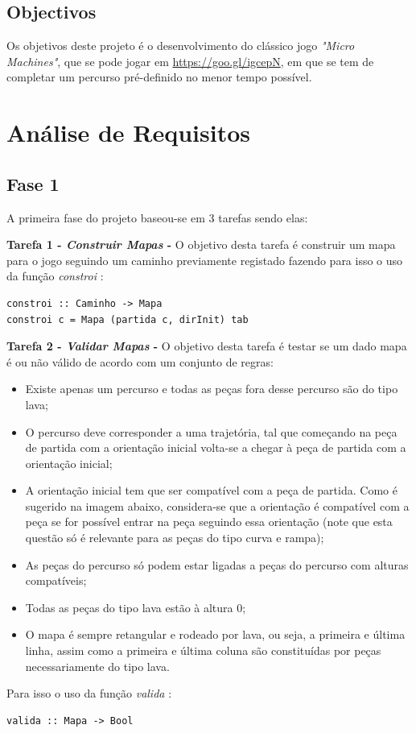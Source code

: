 \documentclass[a4paper]{report} %
\begin{document}
  \section{Objectivos}
Os objetivos deste projeto é o desenvolvimento do clássico jogo 
\emph{"Micro Machines"}, que se pode jogar em \url{https://goo.gl/igcepN}, em que se tem de completar um percurso pré-definido no menor tempo possível.





\chapter{Análise de Requisitos}

\section{Fase 1}
\label{sec:analisefase1}

A primeira fase do projeto baseou-se em 3 tarefas sendo elas:

\textbf{ Tarefa 1 - \emph{Construir Mapas} -} O objetivo desta tarefa é construir um mapa para o jogo seguindo um caminho previamente registado fazendo para isso o uso da função \emph{constroi} : 
\begin{verbatim}
constroi :: Caminho -> Mapa
constroi c = Mapa (partida c, dirInit) tab
\end{verbatim}




\textbf{ Tarefa 2 - \emph{Validar Mapas} -} O objetivo desta tarefa é testar se um dado mapa é ou não válido de acordo com um conjunto
de regras:
\begin{itemize}
\item Existe apenas um percurso e todas as peças fora desse percurso são do tipo lava;
\item O percurso deve corresponder a uma trajetória, tal que começando na peça de partida
com a orientação inicial volta-se a chegar à peça de partida com a orientação inicial;
\item A orientação inicial tem que ser compatível com a peça de partida. Como é sugerido na
imagem abaixo, considera-se que a orientação é compatível com a peça se for possível
entrar na peça seguindo essa orientação (note que esta questão só é relevante para as
peças do tipo curva e rampa);
\item As peças do percurso só podem estar ligadas a peças do percurso com alturas
compatíveis;
\item Todas as peças do tipo lava estão à altura 0;
\item O mapa é sempre retangular e rodeado por lava, ou seja, a primeira e última linha,
assim como a primeira e última coluna são constituídas por peças necessariamente do
tipo lava.
\end{itemize}
Para isso o uso da função \emph{valida} : 
\begin{verbatim}
valida :: Mapa -> Bool
\end{verbatim}
\end{document}
